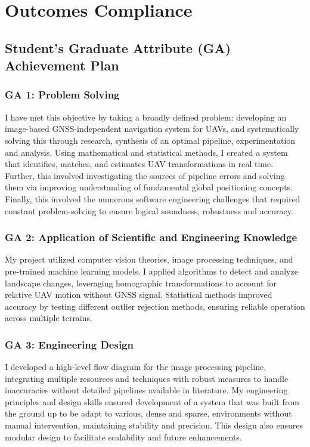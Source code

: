 

\chapter{Outcomes Compliance}
\makeatletter{}\makeatother
\label{appen:GradAttribute}


\section*{Student’s Graduate Attribute (GA) Achievement Plan}

\subsection*{GA 1: Problem Solving}
I have met this objective by taking a broadly defined problem: developing an image-based GNSS-independent navigation system for UAVs, and systematically solving this through research, synthesis of an optimal pipeline, experimentation and analysis. Using mathematical and statistical methods, I created a system that identifies, matches, and estimates UAV transformations in real time. Further, this involved investigating the sources of pipeline errors and solving them via improving understanding of fundamental global positioning concepts. Finally, this involved the numerous software engineering challenges that required constant problem-solving to ensure logical soundness, robustness and accuracy.

\subsection*{GA 2: Application of Scientific and Engineering Knowledge}
My project utilized computer vision theories, image processing techniques, and pre-trained machine learning models. I applied algorithms to detect and analyze landscape changes, leveraging homographic transformations to account for relative UAV motion without GNSS signal. Statistical methods improved accuracy by testing different outlier rejection methods, ensuring reliable operation across multiple terrains.

\subsection*{GA 3: Engineering Design}
I developed a high-level flow diagram for the image processing pipeline, integrating multiple resources and techniques with robust measures to handle inaccuracies without detailed pipelines available in literature. My engineering principles and design skills ensured development of a system that was built from the ground up to be adapt to various, dense and sparse, environments without manual intervention, maintaining stability and precision. This design also ensures modular design to facilitate scalability and future enhancements.

